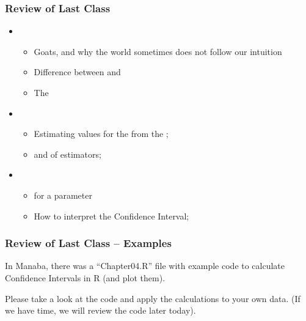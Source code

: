 \documentclass[t]{beamer}
\begin{document}
\begin{frame}
  \frametitle{Review of Last Class}

  \begin{itemize}
  \item {}
    \begin{itemize}
    \item Goats, and why the world sometimes does not follow our intuition
    \item Difference between  and 
    \item The 
    \end{itemize} 

    \vfill

  \item {}
    \begin{itemize}
    \item Estimating values for the  from the ;
    \item {} and  of estimators;
    \end{itemize}
    
    \vfill

  \item {}
    \begin{itemize}
    \item {} for a parameter
    \item How to interpret the Confidence Interval;
    \end{itemize}
  \end{itemize}
\end{frame}

\begin{frame}
  \frametitle{Review of Last Class -- Examples} 

  In Manaba, there was a ``Chapter04.R'' file with example code to
  calculate Confidence Intervals in R (and plot them).

  \bigskip

  Please take a look at the code and apply the calculations to your
  own data. (If we have time, we will review the code later today).
\end{frame}

\end{document}
